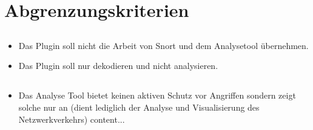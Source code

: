 \section{Abgrenzungskriterien}

\subsection{\sppname}
\begin{itemize}
\item Das Plugin soll nicht die Arbeit von Snort und dem Analysetool übernehmen.

\item Das Plugin soll nur dekodieren und nicht analysieren.

\end{itemize}

\subsection{\programname}
\begin{itemize}

\item Das Analyse Tool bietet keinen aktiven Schutz vor Angriffen sondern zeigt solche nur an (dient lediglich der Analyse und Visualisierung des Netzwerkverkehrs)
content...
\end{itemize} 